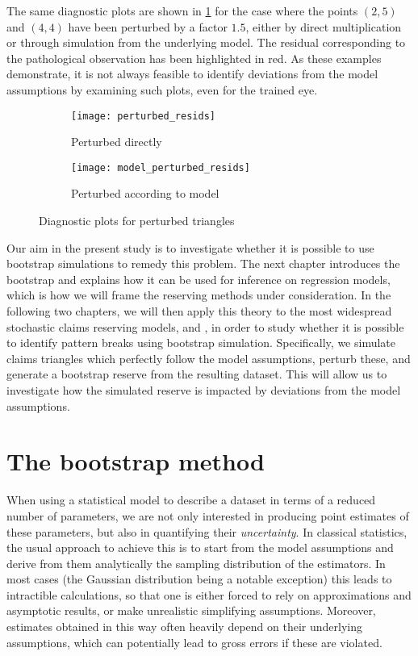 \documentclass[a4paper]{book}
\begin{document}
The same diagnostic plots are shown in \cref{fig:diag-plot-perturbed} for the case where the points $(2, 5)$ and $(4, 4)$ have been perturbed by a factor $1.5$, either by direct multiplication or through simulation from the underlying model. The residual corresponding to the pathological observation has been highlighted in red. As these examples demonstrate, it is not always feasible to identify deviations from the model assumptions by examining such plots, even for the trained eye.

\begin{figure}[!htb]
  \centering
  \begin{subfigure}{\textwidth}
    \texttt{[image: perturbed\_resids]}
    \caption{Perturbed directly}
  \end{subfigure}
  \begin{subfigure}{\textwidth}
    \texttt{[image: model\_perturbed\_resids]}
    \caption{Perturbed according to model}
  \end{subfigure}
  \caption{Diagnostic plots for perturbed triangles}
  \label{fig:diag-plot-perturbed}
\end{figure}

Our aim in the present study is to investigate whether it is possible to use bootstrap simulations to remedy this problem. The next chapter introduces the bootstrap and explains how it can be used for inference on regression models, which is how we will frame the reserving methods under consideration. In the following two chapters, we will then apply this theory to the most widespread stochastic claims reserving models,  and , in order to study whether it is possible to identify pattern breaks using bootstrap simulation. Specifically, we simulate claims triangles which perfectly follow the model assumptions, perturb these, and generate a bootstrap reserve from the resulting dataset. This will allow us to investigate how the simulated reserve is impacted by deviations from the model assumptions.

\mainmatter%

\chapter{The bootstrap method} \label{chapter:boot}

When using a statistical model to describe a dataset in terms of a reduced number of parameters, we are not only interested in producing point estimates of these parameters, but also in quantifying their \emph{uncertainty}. In classical statistics, the usual approach to achieve this is to start from the model assumptions and derive from them analytically the sampling distribution of the estimators. In most cases (the Gaussian distribution being a notable exception) this leads to intractible calculations, so that one is either forced to rely on approximations and asymptotic results, or make unrealistic simplifying assumptions. Moreover, estimates obtained in this way often heavily depend on their underlying assumptions, which can potentially lead to gross errors if these are violated.
\end{document}
